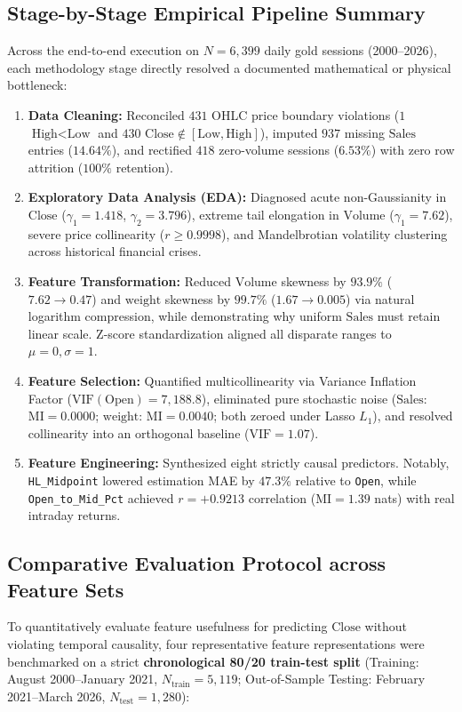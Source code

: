 \documentclass[conference]{IEEEtran}
\begin{document}
\subsection{Stage-by-Stage Empirical Pipeline Summary}
Across the end-to-end execution on $N = 6{,}399$ daily gold sessions (2000--2026), each methodology stage directly resolved a documented mathematical or physical bottleneck:
\begin{enumerate}
    \item \textbf{Data Cleaning:} Reconciled $431$ OHLC price boundary violations ($1$ $\text{High} < \text{Low}$ and $430$ $\text{Close} \notin [\text{Low}, \text{High}]$), imputed $937$ missing $\text{Sales}$ entries ($14.64\%$), and rectified $418$ zero-volume sessions ($6.53\%$) with zero row attrition ($100\%$ retention).
    \item \textbf{Exploratory Data Analysis (EDA):} Diagnosed acute non-Gaussianity in $\text{Close}$ ($\gamma_1 = 1.418$, $\gamma_2 = 3.796$), extreme tail elongation in $\text{Volume}$ ($\gamma_1 = 7.62$), severe price collinearity ($r \ge 0.9998$), and Mandelbrotian volatility clustering across historical financial crises.
    \item \textbf{Feature Transformation:} Reduced $\text{Volume}$ skewness by $93.9\%$ ($7.62 \to 0.47$) and $\text{weight}$ skewness by $99.7\%$ ($1.67 \to 0.005$) via natural logarithm compression, while demonstrating why uniform $\text{Sales}$ must retain linear scale. Z-score standardization aligned all disparate ranges to $\mu = 0, \sigma = 1$.
    \item \textbf{Feature Selection:} Quantified multicollinearity via Variance Inflation Factor ($\text{VIF}(\text{Open}) = 7{,}188.8$), eliminated pure stochastic noise ($\text{Sales}$: $\text{MI} = 0.0000$; $\text{weight}$: $\text{MI} = 0.0040$; both zeroed under Lasso $L_1$), and resolved collinearity into an orthogonal baseline ($\text{VIF} = 1.07$).
    \item \textbf{Feature Engineering:} Synthesized eight strictly causal predictors. Notably, \texttt{HL\_Midpoint} lowered estimation MAE by $47.3\%$ relative to \texttt{Open}, while \texttt{Open\_to\_Mid\_Pct} achieved $r = +0.9213$ correlation ($\text{MI} = 1.39$ nats) with real intraday returns.
\end{enumerate}

\subsection{Comparative Evaluation Protocol across Feature Sets}
To quantitatively evaluate feature usefulness for predicting $\text{Close}$ without violating temporal causality, four representative feature representations were benchmarked on a strict \textbf{chronological 80/20 train-test split} (Training: August 2000--January 2021, $N_{\text{train}} = 5{,}119$; Out-of-Sample Testing: February 2021--March 2026, $N_{\text{test}} = 1{,}280$):
\end{document}
